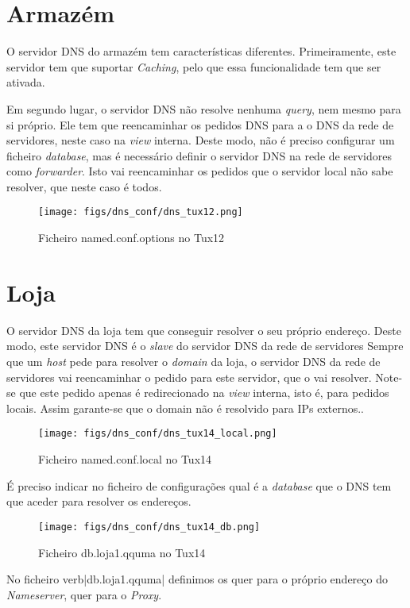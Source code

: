 \section{Armazém} \label{dns_armazem}

O servidor DNS do armazém tem características diferentes.
Primeiramente, este servidor tem que suportar \textit{Caching}, pelo que essa funcionalidade tem que ser ativada.

Em segundo lugar, o servidor DNS não resolve nenhuma \textit{query}, nem mesmo para si próprio.
Ele tem que reencaminhar os pedidos DNS para a o DNS da rede de servidores, neste caso na \textit{view} interna.
Deste modo, não é preciso configurar um ficheiro \textit{database}, mas é necessário definir o servidor DNS na rede de servidores como \textit{forwarder}.
Isto vai reencaminhar os pedidos que o servidor local não sabe resolver, que neste caso é todos.

\begin{figure}[H]
    \centering
    \texttt{[image: figs/dns\_conf/dns\_tux12.png]}
    \caption{Ficheiro named.conf.options no Tux12}
    \label{fig:dns_tux12}
\end{figure}


\section{Loja} \label{dns_loja}

O servidor DNS da loja tem que conseguir resolver o seu próprio endereço. Deste modo, este servidor DNS é o \textit{slave} do servidor DNS da rede de servidores
Sempre que um \textit{host} pede para resolver o \textit{domain} da loja, o servidor DNS da rede de servidores vai reencaminhar o pedido para este servidor, que o vai resolver.
Note-se que este pedido apenas é redirecionado na \textit{view} interna, isto é, para pedidos locais.
Assim garante-se que o domain não é resolvido para IPs externos..

\begin{figure}[H]
    \centering
    \texttt{[image: figs/dns\_conf/dns\_tux14\_local.png]}
    \caption{Ficheiro named.conf.local no Tux14}
    \label{fig:dns_tux14_local}
\end{figure}

É preciso indicar no ficheiro de configurações qual é a \textit{database} que o DNS tem que aceder para resolver os endereços.

\begin{figure}[H]
    \centering
    \texttt{[image: figs/dns\_conf/dns\_tux14\_db.png]}
    \caption{Ficheiro db.loja1.qquma no Tux14}
    \label{fig:dns_tux14_db}
\end{figure}

No ficheiro verb|db.loja1.qquma| definimos os  quer para o próprio endereço do \textit{Nameserver}, quer para o \textit{Proxy}.